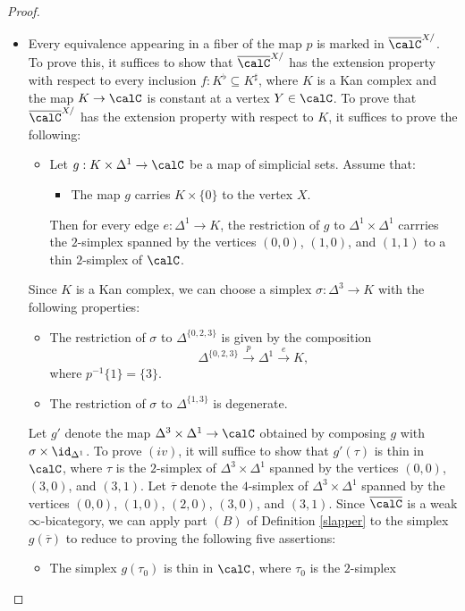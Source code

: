 \begin{proof}
\begin{itemize}
\item[$(4)$] Every equivalence appearing in a fiber of the map $p$ is marked in
$\overline{\calC}^{X/}$. To prove this, it suffices to show that $\overline{\calC}^{X/}$ has the
extension property with respect to every inclusion $f: K^{\flat} \subseteq K^{\sharp}$, where
$K$ is a Kan complex and the map $K \rightarrow \calC$ is constant at a vertex $Y \in \calC$.
To prove that $\overline{\calC}^{X/}$ has the extension property with respect to $K$, it suffices to prove the following:
\begin{itemize}
\item Let $g: K \times \Delta^1 \rightarrow \calC$ be a map of simplicial sets. Assume that:
\begin{itemize}
\item[$(i)$] The map $g$ carries $K \times \{0\}$ to the vertex $X$.
\end{itemize}
Then for every edge $e: \Delta^1 \rightarrow K$, the restriction of $g$ to
$\Delta^1 \times \Delta^1$ carrries the $2$-simplex spanned by the vertices
$(0,0)$, $(1,0)$, and $(1,1)$ to a thin $2$-simplex of $\calC$.
\end{itemize}
Since $K$ is a Kan complex, we can choose a simplex $\sigma: \Delta^3 \rightarrow K$
with the following properties:
\begin{itemize}
\item[$(ii)$] The restriction of $\sigma$ to $\Delta^{ \{0,2,3\} }$ is given by the composition
$$ \Delta^{ \{0,2,3\} } \stackrel{p}{\rightarrow} \Delta^1 \stackrel{e}{\rightarrow} K,$$
where $p^{-1} \{1\} = \{3\}$.
\item[$(iii)$] The restriction of $\sigma$ to $\Delta^{ \{1,3\}}$ is degenerate.
\end{itemize}
Let $g'$ denote the map $\Delta^3 \times \Delta^1 \rightarrow \calC$ obtained by composing
$g$ with $\sigma \times \id_{\Delta^1}$. To prove $(iv)$, it will suffice to show that
$g'(\tau)$ is thin in $\calC$, where $\tau$ is the $2$-simplex of $\Delta^3 \times \Delta^1$ spanned by
the vertices $(0,0)$, $(3,0)$, and $(3,1)$. Let $\overline{\tau}$ denote the $4$-simplex of
$\Delta^3 \times \Delta^1$ spanned by the vertices $(0,0)$, $(1,0)$, $(2,0)$, $(3,0)$, and $(3,1)$.
Since $\overline{\calC}$ is a weak $\infty$-bicategory, we can apply part $(B)$ of Definition \ref{slapper}
to the simplex $g(\overline{\tau})$ to reduce to proving the following five assertions:
\begin{itemize}
\item The simplex $g(\tau_0)$ is thin in $\calC$, where $\tau_0$ is the $2$-simplex

\end{itemize}
\end{itemize}
\end{proof}
